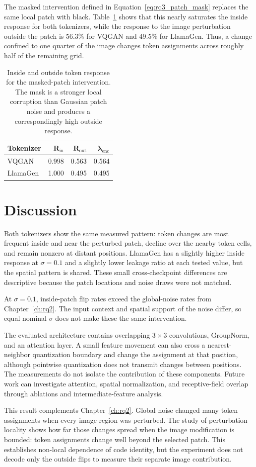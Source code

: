 The masked intervention defined in Equation~\ref{eq:rq3_patch_mask} replaces the
same local patch with black. Table~\ref{tab:rq3_masked_summary} shows that this
nearly saturates the inside response for both tokenizers, while the response to
the image perturbation outside the patch is 56.3\% for VQGAN and 49.5\% for
LlamaGen. Thus, a change confined to one quarter of the image changes token
assignments across roughly half of the remaining grid.

\begin{table}[t]
    \centering
    \small
    \begin{tabular}{lrrr}
        \textbf{Tokenizer} & $\boldsymbol{R_{\mathrm{in}}}$ & $\boldsymbol{R_{\mathrm{out}}}$ & $\boldsymbol{\lambda_{\mathrm{enc}}}$ \\ \hline
        VQGAN & 0.998 & 0.563 & 0.564 \\
        LlamaGen & 1.000 & 0.495 & 0.495 \\
    \end{tabular}
    \caption{Inside and outside token response for the masked-patch intervention. The mask is a stronger local corruption than Gaussian patch noise and produces a correspondingly high outside response.}
    \label{tab:rq3_masked_summary}
\end{table}
\section{Discussion}
\label{sec:rq3_discussion}

Both tokenizers show the same measured pattern: token changes are most frequent
inside and near the perturbed patch, decline over the nearby token cells, and
remain nonzero at distant positions. LlamaGen has a slightly higher inside
response at $\sigma=0.1$ and a slightly lower leakage ratio at each tested
value, but the spatial pattern is shared. These small cross-checkpoint
differences are descriptive because the patch locations and noise draws were
not matched.

At $\sigma=0.1$, inside-patch flip rates exceed the global-noise rates from
Chapter~\ref{ch:rq2}. The input context and spatial support of the noise differ,
so equal nominal $\sigma$ does not make these the same intervention.

The evaluated architecture contains overlapping $3\times3$ convolutions,
GroupNorm, and an attention layer. A small feature movement can also cross a
nearest-neighbor quantization boundary and change the assignment at that
position, although pointwise quantization does not transmit changes between
positions. The measurements do not isolate the contribution of these
components. Future work can investigate attention, spatial normalization, and
receptive-field overlap through ablations and intermediate-feature analysis.

This result complements Chapter~\ref{ch:rq2}. Global noise changed many token
assignments when every image region was perturbed. The study of perturbation
locality shows how far those changes spread when the image modification is
bounded: token assignments change well beyond the selected patch. This
establishes non-local dependence of code identity, but the experiment does not
decode only the outside flips to measure their separate image contribution.
